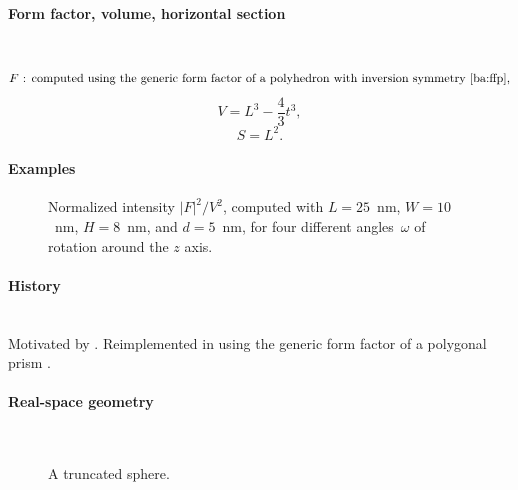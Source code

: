 \paragraph{Form factor, volume, horizontal section}\strut\\
\begin{equation*}
  F \text{~: computed using the generic form factor of a polyhedron
             with inversion symmetry~\cite{ba:ffp},}
\end{equation*}
\begin{equation*}
  V = L^3 - \dfrac{4}{3}t^3,
\end{equation*}
\begin{equation*}
  S = L^2.
\end{equation*}

\paragraph{Examples}\strut

\begin{figure}[H]
\begin{center}
\end{center}
\caption{Normalized intensity $|F|^2/V^2$,
computed with $L=25$~nm, $W=10$~nm, $H=8$~nm, and $d=5$~nm,
for four different angles~$\omega$ of rotation around the $z$ axis.}
\end{figure}

\paragraph{History}\strut\\
Motivated by \cite{HeSS74}.
Reimplemented in  using the generic form factor
of a polygonal prism \cite{ba:ffp}.


\label{STruncatedSphere}

\paragraph{Real-space geometry}\strut\\

\begin{figure}[H]
\hfill
{}
\hfill
{}
\hfill
{}
\hfill
\caption{A truncated sphere.}
\end{figure}
\FloatBarrier

